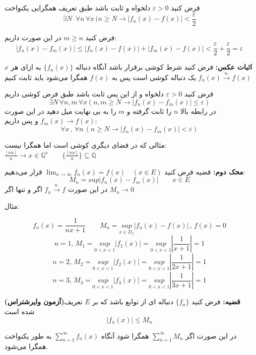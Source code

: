 \documentclass[12pt]{report}
\begin{document}
  فرض کنید 
  $\varepsilon > 0$
  دلخواه و ثابت باشد طبق تعریف همگرایی یکنواخت
  \[
   \exists N \,\,\, \forall n \, \forall x\, (n  \geq N \rightarrow |f_n(x) - f(x)| < \frac{\varepsilon}{2}
  \]
  
  فرض کنید 
  $m \geq n $
  در این صورت داریم:
  \[
  |f_n(x) - f_m(x)| \leq |f_n(x) - f(x)| + |f_m(x) - f(x)| < \frac{\varepsilon}{2} + \frac{\varepsilon}{2} = \varepsilon
  \] 
  
  \textbf{اثبات عکس:}
  فرض کنید شرط کوشی برقرار باشد آنگاه دنباله
  $\{f_n(x)\}$
  به  ازای هر 
  $x$
   یک دنباله کوشی است پس به 
   $f(x)$
   همگرا می‌شود باید ثابت کنیم
   $f_n(x)  \overset{u.}{\rightarrow} f(x)$
   
   فرض کنید 
   $\varepsilon > 0$
   دلخواه و از این پس ثابت باشد طبق فرض کوشی داریم
   \[
   \exists N \, \forall n, m \, \forall x(n , m  \geq N \rightarrow |f_n(x) - f_m(x)| \leq \varepsilon)
   \]
   در رابطه بالا 
   $n$
   را ثابت گرفته و 
   $m$
   را به بی نهایت میل دهید در این صورت 
   $f_m(x) \rightarrow f(x)$
   و پس داریم:
   \[
   \forall x \,, \, \forall n \, (n \geq N \rightarrow |f_n(x) - f_m(x)| < \varepsilon)
   \]
   

مثالی که در فضای دیگری کوشی است اما همگرا نیست:
$\frac{[nx]}{n} \rightarrow x \in \mathbb{Q^c} \qquad \{\frac{[nx]}{n}\} \subseteq \mathbb{Q}$	

\textbf{محک دوم:}
قضیه فرض کنید
$\lim_{n \to \infty} f_n(x) = f(x) \quad (x \in E)$
قرار می‌دهیم:
\[
M_n = sup |f_n(x) - f_m(x)| \qquad x \in E
\]
در این صورت 
$f_n  \overset{u.}{\rightarrow} f$
اگر و تنها اگر
$M_n \rightarrow 0$

مثال:

\[
f_n(x) = \frac{1}{nx + 1} \qquad M_n = \underset{x \in D_f}{sup}|f_n(x) - f(x)| \, , \, f(x) = 0
\]
\[
n = 1 , \, M_1 = \underset{0 < x <1}{sup}|f_1(x)|=  \underset{0 < x <1}{sup}|\frac{1}{x + 1}| = 1
\]
\[
n = 2 , \, M_2 = \underset{0 < x <1}{sup}|f_2(x)|= \underset{0 < x <1}{sup}|\frac{1}{2x + 1}| = 1
\]
\[
n = 3 , \, M_3 = \underset{0 < x <1}{sup}|f_3(x)|= \underset{0 < x <1}{sup}|\frac{1}{3x + 1}| = 1
\]

\textbf{(آزمون وایرشتراس)قضیه:}
فرض کنید
$\{f_n\}$
دنباله ای از توابع باشد که بر 
$E$
تعریف شده است
\begin{equation}\label{eq9}
|f_n(x)| \leq M_n
\end{equation}

در این صورت اگر 
$\sum_{n = 1}^{\infty} M_n$
 همگرا شود آنگاه
 $\sum_{n = 1}^{\infty} f_n(x)$
 به طور یکنواخت همگرا می‌شود.
 
\end{document}
